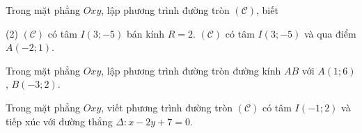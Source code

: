 \begin{vd}
	Trong mặt phẳng $Oxy$, lập phương trình đường tròn $\mathscr{(C)}$, biết
	\begin{tasks}(2)
		\task $\mathscr{(C)}$  có tâm $I(3;-5)$ bán kính $R=2$.
		\task  $\mathscr{(C)}$ có tâm $I(3;-5)$ và qua điểm $A(-2;1)$.
	\end{tasks}
	
	\loigiai{
		
	}
\end{vd}
\begin{vd}
	Trong mặt phẳng $Oxy$, lập phương trình đường tròn đường kính $AB$ với $A\left(1;6\right)$, $B\left(-3;2\right)$.
\end{vd}
\begin{vd}
	Trong mặt phẳng $Oxy$, viết phương trình đường tròn $\mathscr{(C)}$ có tâm $I\left(-1;2\right)$ và tiếp xúc với đường thẳng $\Delta:x-2y+7=0$.
\end{vd}

